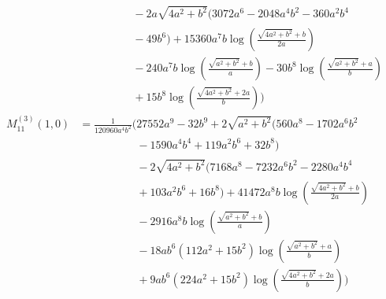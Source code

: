 \begin{align*}
&\phantom{{}=\frac{1}{13440 a^{3} b^{2}}\Bigg(}- 2 a \sqrt{4 a^{2} + b^{2}}\bigl(3072 a^{6} - 2048 a^{4} b^{2} - 360 a^{2} b^{4}\\
&\phantom{{}=\frac{1}{13440 a^{3} b^{2}}\Bigg(}- 49 b^{6}\bigr) + 15360 a^{7} b \log\left(\frac{\sqrt{4 a^{2} + b^{2}} + b}{2 a}\right)\\
&\phantom{{}=\frac{1}{13440 a^{3} b^{2}}\Bigg(}- 240 a^{7} b \log\left(\frac{\sqrt{a^{2} + b^{2}} + b}{a}\right) - 30 b^{8} \log\left(\frac{\sqrt{a^{2} + b^{2}} + a}{b}\right)\\
&\phantom{{}=\frac{1}{13440 a^{3} b^{2}}\Bigg(}+ 15 b^{8} \log\left(\frac{\sqrt{4 a^{2} + b^{2}} + 2 a}{b}\right)\Bigg)\\[1.2ex]
M^{(3)}_{11}(1,0) &= \frac{1}{120960 a^{4} b^{2}}\Bigg(27552 a^{9} - 32 b^{9} + 2 \sqrt{a^{2} + b^{2}}\bigl(560 a^{8} - 1702 a^{6} b^{2}\\
&\phantom{{}=\frac{1}{120960 a^{4} b^{2}}\Bigg(}- 1590 a^{4} b^{4} + 119 a^{2} b^{6} + 32 b^{8}\bigr)\\
&\phantom{{}=\frac{1}{120960 a^{4} b^{2}}\Bigg(}- 2 \sqrt{4 a^{2} + b^{2}}\bigl(7168 a^{8} - 7232 a^{6} b^{2} - 2280 a^{4} b^{4}\\
&\phantom{{}=\frac{1}{120960 a^{4} b^{2}}\Bigg(}+ 103 a^{2} b^{6} + 16 b^{8}\bigr) + 41472 a^{8} b \log\left(\frac{\sqrt{4 a^{2} + b^{2}} + b}{2 a}\right)\\
&\phantom{{}=\frac{1}{120960 a^{4} b^{2}}\Bigg(}- 2916 a^{8} b \log\left(\frac{\sqrt{a^{2} + b^{2}} + b}{a}\right)\\
&\phantom{{}=\frac{1}{120960 a^{4} b^{2}}\Bigg(}- 18 a b^{6} \left(112 a^{2} + 15 b^{2}\right) \log\left(\frac{\sqrt{a^{2} + b^{2}} + a}{b}\right)\\
&\phantom{{}=\frac{1}{120960 a^{4} b^{2}}\Bigg(}+ 9 a b^{6} \left(224 a^{2} + 15 b^{2}\right) \log\left(\frac{\sqrt{4 a^{2} + b^{2}} + 2 a}{b}\right)\Bigg)
\end{align*}
